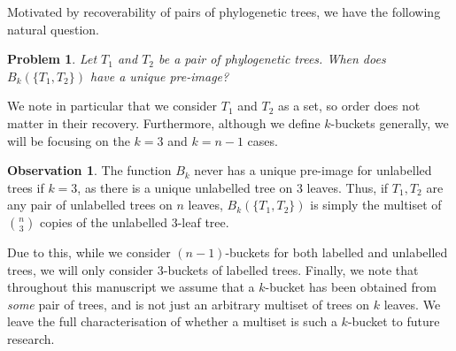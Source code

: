 \documentclass[12pt]{article}
\newtheorem{Problem}[Theorem]{Problem}
\theoremstyle{definition}
\newtheorem{Observation}[Theorem]{Observation}
\begin{document}
Motivated by recoverability of pairs of phylogenetic trees, we have the following natural question.

\begin{Problem}
    Let $T_1$ and $T_2$ be a pair of phylogenetic trees. When does $B_k(\{T_1,T_2\})$ have a unique pre-image?
\end{Problem}
We note in particular that we consider $T_1$ and $T_2$ as a set, so order does not matter in their recovery. Furthermore, although we define $k$-buckets generally, we will be focusing on the $k=3$ and $k=n-1$ cases.

\begin{Observation}
    The function $B_k$ never has a unique pre-image for unlabelled trees if $k=3$, as there is a unique unlabelled tree on $3$ leaves. Thus, if $T_1,T_2$ are any pair of unlabelled trees on $n$ leaves, $B_k(\{T_1,T_2\})$ is simply the multiset of $\binom{n}{3}$ copies of the unlabelled $3$-leaf tree.
\end{Observation}

Due to this, while we consider $(n-1)$-buckets for both labelled and unlabelled trees, we will only consider $3$-buckets of labelled trees. Finally, we note that throughout this manuscript we assume that a $k$-bucket has been obtained from \emph{some} pair of trees, and is not just an arbitrary multiset of trees on $k$ leaves. We leave the full characterisation of whether a multiset is such a $k$-bucket to future research.
\end{document}
